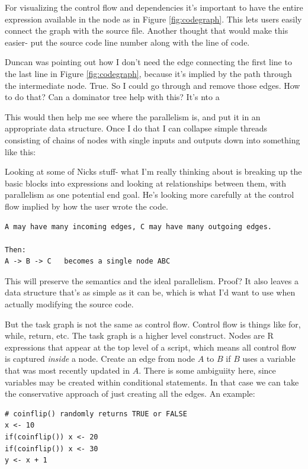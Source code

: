 \documentclass[12pt]{article}
\begin{document}
For visualizing the control flow and dependencies it's important to have the entire
expression available in the node as in Figure \ref{fig:codegraph}. This
lets users easily connect the graph with the source file. Another thought
that would make this easier- put the source code line number along with the
line of code.

Duncan was pointing out how I don't need the edge connecting the first line
to the last line in Figure \ref{fig:codegraph}, because it's implied by the
path through the intermediate node. True. So I could go through and remove
those edges. How to do that? Can a dominator tree help with this? It's nto
a

This would then help me see where the parallelism is, and put it in an
appropriate data structure. Once I do that I can collapse simple threads
consisting of chains of nodes with single inputs and outputs
down into something like this:

Looking at some of Nicks stuff- what I'm really thinking about is breaking
up the basic blocks into expressions and looking at relationships between
them, with parallelism as one potential end goal. He's looking
more carefully at the control flow implied by how the user wrote the code.

\begin{verbatim}
A may have many incoming edges, C may have many outgoing edges.

Then:
A -> B -> C   becomes a single node ABC
\end{verbatim}

This will preserve the semantics and the ideal parallelism. Proof?
It also leaves a data structure that's as simple as it can be, which is
what I'd want to use when actually modifying the source code.

But the task graph is not the same as control flow. Control flow is things
like for, while, return, etc. The task graph is a higher level construct. 
Nodes are R expressions that appear at the top level of a script, which
means all control flow is captured \emph{inside} a node. Create an edge
from node $A$ to $B$ if $B$ uses a variable that was most recently updated
in $A$. There is some ambiguiity here, since variables may be created
within conditional statements. In that case we can take the conservative
approach of just creating all the edges. An example:

\begin{verbatim}
# coinflip() randomly returns TRUE or FALSE
x <- 10
if(coinflip()) x <- 20
if(coinflip()) x <- 30
y <- x + 1
\end{verbatim}
\end{document}
